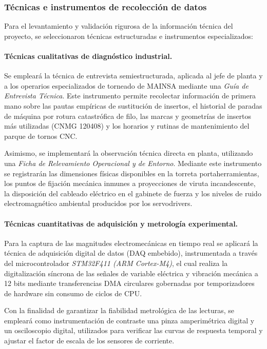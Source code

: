 \subsubsection{Técnicas e instrumentos de recolección de datos}
\label{subsubsec:tecnicas_instrumentos}

Para el levantamiento y validación rigurosa de la información técnica del proyecto, se seleccionaron técnicas estructuradas e instrumentos especializados:

\paragraph*{Técnicas cualitativas de diagnóstico industrial.}
Se empleará la técnica de entrevista semiestructurada, aplicada al jefe de planta y a los operarios especializados de torneado de MAINSA mediante una \textit{Guía de Entrevista Técnica}. Este instrumento permite recolectar información de primera mano sobre las pautas empíricas de sustitución de insertos, el historial de paradas de máquina por rotura catastrófica de filo, las marcas y geometrías de insertos más utilizadas (CNMG 120408) y los horarios y rutinas de mantenimiento del parque de tornos CNC.

Asimismo, se implementará la observación técnica directa en planta, utilizando una \textit{Ficha de Relevamiento Operacional y de Entorno}. Mediante este instrumento se registrarán las dimensiones físicas disponibles en la torreta portaherramientas, los puntos de fijación mecánica inmunes a proyecciones de viruta incandescente, la disposición del cableado eléctrico en el gabinete de fuerza y los niveles de ruido electromagnético ambiental producidos por los servodrivers.

\paragraph*{Técnicas cuantitativas de adquisición y metrología experimental.}
Para la captura de las magnitudes electromecánicas en tiempo real se aplicará la técnica de adquisición digital de datos (DAQ embebido), instrumentada a través del microcontrolador \textit{STM32F411 (ARM Cortex-M4)}, el cual realiza la digitalización síncrona de las señales de variable eléctrica y vibración mecánica a 12 bits mediante transferencias DMA circulares gobernadas por temporizadores de hardware sin consumo de ciclos de CPU.

Con la finalidad de garantizar la fiabilidad metrológica de las lecturas, se empleará como instrumentación de contraste una pinza amperimétrica digital y un osciloscopio digital, utilizados para verificar las curvas de respuesta temporal y ajustar el factor de escala de los sensores de corriente.

